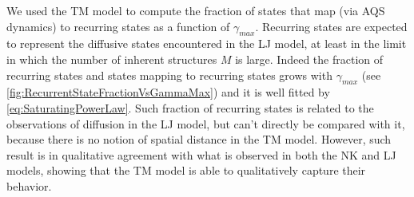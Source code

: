 We used the TM model to compute the fraction of states that map (via AQS dynamics) to recurring states as a function of $\gamma_{max}$. Recurring states are expected to represent the diffusive states encountered in the LJ model, at least in the limit in which the number of inherent structures $M$ is large. Indeed the fraction of recurring states and states mapping to recurring states grows with $\gamma_{max}$ (see \autoref{fig:RecurrentStateFractionVsGammaMax}) and it is well fitted by \autoref{eq:SaturatingPowerLaw}. Such fraction of recurring states is related to the observations of diffusion in the LJ model, but can't directly be compared with it, because there is no notion of spatial distance in the TM model. However, such result is in qualitative agreement with what is observed in both the NK and LJ models, showing that the TM model is able to qualitatively capture their behavior.

